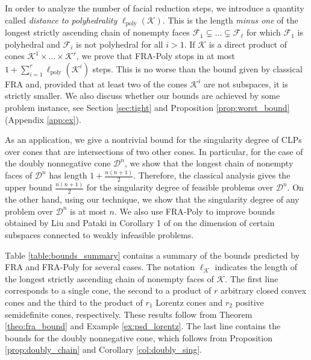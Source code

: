 \documentclass{article}
\newcommand{\doubly}[1]{{\mathcal{D}^{#1}}}
\newcommand{\stdCone}{ {\mathcal{K}}}
\newcommand{\stdFace}{ \mathcal{F}}
\newcommand{\distP}{\ell _{\text{poly}}}
\begin{document}
In order to analyze the number of facial reduction steps, 
we introduce a quantity called \emph{distance to polyhedrality} $\distP(\stdCone)$. This is the 
length \emph{minus one} of the longest strictly ascending chain of nonempty faces 
$\stdFace _1 \subsetneq \ldots \subsetneq \stdFace _\ell$ for 
which $\stdFace _1$ is polyhedral and $\stdFace _i$ is not polyhedral for all $i > 1$.  
If $\stdCone$ is a direct product of  cones $\stdCone^1 \times \ldots \times \stdCone^r$, 
we prove that FRA-Poly stops in at most $1 + \sum _{i = 1}^r \distP(\stdCone^i)$ steps. This is no 
worse than the bound given by classical FRA and, provided that at least two of the cones 
$\stdCone^i$ are not subspaces, it is strictly smaller. We also discuss whether our bounds 
are achieved by some problem instance, see Section \ref{sec:tight} and Proposition \ref{prop:worst_bound} (Appendix \ref{app:ex}).

As an application, we give a nontrivial bound for the singularity degree of CLPs
over cones that are intersections of two other cones. In particular, 
for the case of the doubly nonnegative cone $\doubly{n}$, we show 
that the longest chain of nonempty faces of $\doubly{n}$ has length $1 + \frac{n(n+1)}{2}$.
Therefore, the classical analysis gives the upper bound    $\frac{n(n+1)}{2}$ for the singularity
 degree of feasible problems over $\doubly{n}$.
On the other hand, using our technique, we show that the singularity degree of any problem over 
$\doubly{n}$ is at most $n$. We also use FRA-Poly to improve  bounds obtained by Liu and Pataki in Corollary 1 of \cite{LP17} on 
the dimension of certain subspaces connected to weakly infeasible problems.

Table \ref{table:bounds_summary} contains a summary of the bounds 
predicted by FRA and FRA-Poly for several cases. The notation 
$\ell _{\stdCone}$ indicates the length of the longest strictly ascending  chain of 
nonempty faces of $\stdCone$.
The first line corresponds 
to a single cone, the second to a product of $r$ arbitrary closed convex cones 
and the third to the product of $r_1$ Lorentz  cones and $r_2$ positive 
semidefinite cones, respectively. These results follow from Theorem \ref{theo:fra_bound} and 
 Example \ref{ex:psd_lorentz}. 
The last line contains the bounds for the doubly nonnegative cone, which follows 
from Proposition \ref{prop:doubly_chain} and  Corollary \ref{col:doubly_sing}.
\end{document}
